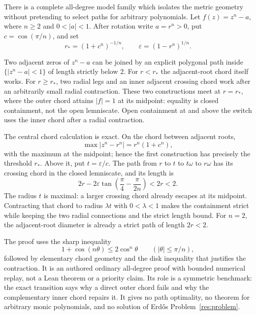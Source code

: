 \documentclass[11pt]{article}
\begin{document}

There is a complete all-degree model family which isolates the metric geometry
without pretending to select paths for arbitrary polynomials.  Let
$f(z)=z^n-a$, where $n\ge2$ and $0<|a|<1$.  After rotation write $a=r^n>0$,
put $c=\cos(\pi/n)$, and set
\[
 r_*=(1+c^n)^{-1/n},\qquad
 \varepsilon=(1-r^n)^{1/n}.
\]

\begin{theorem}
Two adjacent zeros of $z^n-a$ can be joined by an explicit polygonal path
inside $\{|z^n-a|<1\}$ of length strictly below $2$.  For $r<r_*$ the
adjacent-root chord itself works.  For $r\ge r_*$, two radial legs and an
inner adjacent crossing chord work after an arbitrarily small radial
contraction.  These two constructions meet at $r=r_*$, where the outer chord attains
$|f|=1$ at its midpoint: equality is closed containment, not the open
lemniscate.  Open containment at and above the switch uses the inner chord
after a radial contraction.
\end{theorem}

The central chord calculation is exact.  On the chord between adjacent roots,
\[
 \max |z^n-r^n|=r^n(1+c^n),
\]
with the maximum at the midpoint; hence the first construction has precisely
the threshold $r_*$.  Above it, put $t=\varepsilon/c$.  The path from $r$ to
$t$ to $t\omega$ to $r\omega$ has its crossing chord in the closed
lemniscate, and its length is
\[
 2r-2\varepsilon\tan\!\left(\frac\pi4-\frac\pi{2n}\right)<2r<2.
\]
The radius $t$ is maximal: a larger crossing chord already escapes at its
midpoint.  Contracting that chord to radius $\lambda t$ with $0<\lambda<1$
makes the containment strict while keeping the two radial connections and the
strict length bound.  For $n=2$, the adjacent-root diameter is already a
strict path of length $2r<2$.

The proof uses the sharp inequality
\[
  1+\cos(n\theta)\le2\cos^n\theta
  \qquad (|\theta|\le\pi/n),
\]
followed by elementary chord geometry and the disk inequality that justifies
the contraction.  It is an authored ordinary all-degree proof with bounded
numerical replay, not a Lean theorem or a priority claim.  Its role is a
symmetric benchmark: the exact transition says why a direct outer chord fails
and why the complementary inner chord repairs it.  It gives no path
optimality, no theorem for arbitrary monic polynomials, and no solution of
Erd\H{o}s Problem~\ref{res:problem}.
\end{document}
